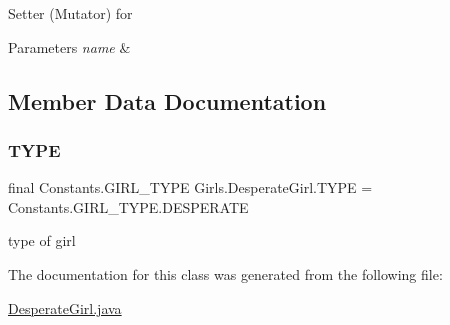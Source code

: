 Setter (Mutator) for 
\begin{DoxyParams}{Parameters}
{\em name} & \\
\hline
\end{DoxyParams}


\subsection{Member Data Documentation}
\mbox{\label{class_girls_1_1_desperate_girl_a65e9dec8d71a05510f4be3f3fea2f648}} 
\subsubsection{\texorpdfstring{T\+Y\+PE}{TYPE}}
{\footnotesize\ttfamily final Constants.\+G\+I\+R\+L\+\_\+\+T\+Y\+PE Girls.\+Desperate\+Girl.\+T\+Y\+PE = Constants.\+G\+I\+R\+L\+\_\+\+T\+Y\+P\+E.\+D\+E\+S\+P\+E\+R\+A\+TE}

type of girl 

The documentation for this class was generated from the following file\+:\begin{DoxyCompactItemize}
\item 
\hyperlink{_desperate_girl_8java}{Desperate\+Girl.\+java}\end{DoxyCompactItemize}
